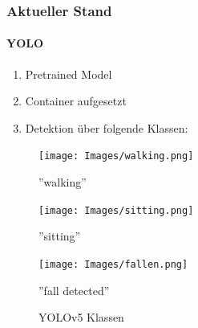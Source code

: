 \documentclass[aspectratio=169]{beamer}
\begin{document}
\begin{frame}
	\frametitle{Aktueller Stand}
	\framesubtitle{YOLO}
	
		\begin{enumerate}
		\item Pretrained Model
		\item Container aufgesetzt
		\item Detektion über folgende Klassen:
	\end{enumerate}
	
	\begin{figure}
		\centering
		\begin{minipage}[t]{0.3\textwidth}
			\centering
			\texttt{[image: Images/walking.png]}
			\caption*{''walking''}
		\end{minipage}
		\hfill
		\begin{minipage}[t]{0.3\textwidth}
			\centering
			\texttt{[image: Images/sitting.png]}
			\caption*{''sitting''}
		\end{minipage}
		\hfill
		\begin{minipage}[t]{0.3\textwidth}
			\centering
			\texttt{[image: Images/fallen.png]}
			\caption*{ ''fall detected''}
		\end{minipage}
		\caption{YOLOv5 Klassen}
		\label{fig:yolo_classes}
	\end{figure}

\end{frame}
\end{document}
